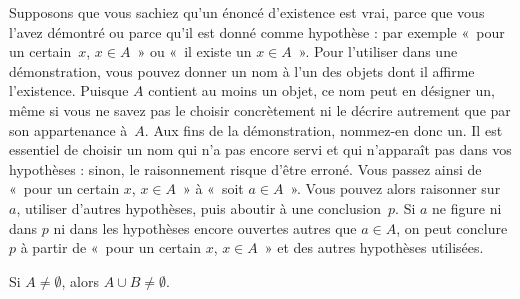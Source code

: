 \documentclass[../../../include/open-logic-section]{subfiles}
\begin{document}
Supposons que vous sachiez qu'un énoncé d'existence
est vrai, parce que vous l'avez démontré ou parce
qu'il est donné comme hypothèse : par exemple
«~pour un certain~$x$, $x \in A$~» ou
«~il existe un $x \in A$~». Pour l'utiliser dans
une démonstration, vous pouvez donner un nom à
l'un des objets dont il affirme l'existence.
Puisque $A$ contient au moins un objet, ce nom
peut en désigner un, même si vous ne savez pas
le choisir concrètement ni le décrire autrement
que par son appartenance à~$A$. Aux fins de la
démonstration, nommez-en donc un. Il est essentiel
de choisir un nom qui n'a pas encore servi et
qui n'apparaît pas dans vos hypothèses : sinon,
le raisonnement risque d'être erroné. Vous passez
ainsi de «~pour un certain $x$, $x \in A$~» à
«~soit $a \in A$~». Vous pouvez alors raisonner
sur~$a$, utiliser d'autres hypothèses, puis
aboutir à une conclusion~$p$. Si $a$ ne figure ni dans $p$
ni dans les hypothèses encore ouvertes autres que $a \in A$,
on peut conclure $p$ à partir de «~pour un certain $x$, $x \in A$~»
et des autres hypothèses utilisées.

\begin{prop}
Si $A \neq \emptyset$, alors $A \cup B \neq \emptyset$.
\end{prop}
\end{document}
